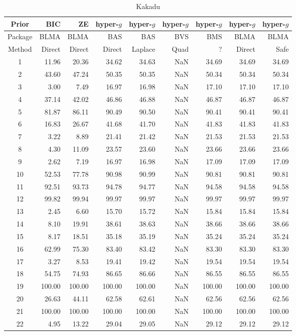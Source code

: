 \begin{table}[ht]
	\centering
	{\small 	
	\begin{tabular}{c|r|r|rrrrrr}
		Prior   & BIC    & ZE     & hyper-$g$ & hyper-$g$ & hyper-$g$  & hyper-$g$ & hyper-$g$ & hyper-$g$ \\
		\hline 
		Package & BLMA   & BLMA   & BAS       & BAS       & BVS        & BMS       & BLMA      & BLMA       \\
		\hline 
		Method  & Direct & Direct & Direct    & Laplace   & Quad & ?         & Direct    & Safe      \\ 
		\hline
		1 & 11.96 & 20.36 & 34.62 & 34.63 & NaN & 34.69 & 34.69 & 34.69 \\ 
		2 & 43.60 & 47.24 & 50.35 & 50.35 & NaN & 50.34 & 50.34 & 50.34 \\ 
		3 & 3.00 & 7.49 & 16.97 & 16.98 & NaN & 17.10 & 17.10 & 17.10 \\ 
		4 & 37.14 & 42.02 & 46.86 & 46.88 & NaN & 46.87 & 46.87 & 46.87 \\ 
		5 & 81.87 & 86.11 & 90.49 & 90.50 & NaN & 90.41 & 90.41 & 90.41 \\ 
		6 & 16.83 & 26.67 & 41.68 & 41.70 & NaN & 41.83 & 41.83 & 41.83 \\ 
		7 & 3.22 & 8.89 & 21.41 & 21.42 & NaN & 21.53 & 21.53 & 21.53 \\ 
		8 & 4.30 & 11.09 & 23.57 & 23.60 & NaN & 23.66 & 23.66 & 23.66 \\ 
		9 & 2.62 & 7.19 & 16.97 & 16.98 & NaN & 17.09 & 17.09 & 17.09 \\ 
		10 & 52.53 & 77.78 & 90.98 & 90.99 & NaN & 90.81 & 90.81 & 90.81 \\ 
		11 & 92.51 & 93.73 & 94.78 & 94.77 & NaN & 94.58 & 94.58 & 94.58 \\ 
		12 & 99.82 & 99.94 & 99.97 & 99.97 & NaN & 99.97 & 99.97 & 99.97 \\ 
		13 & 2.45 & 6.60 & 15.70 & 15.72 & NaN & 15.84 & 15.84 & 15.84 \\ 
		14 & 8.10 & 19.91 & 38.61 & 38.63 & NaN & 38.66 & 38.66 & 38.66 \\ 
		15 & 8.17 & 18.51 & 35.18 & 35.19 & NaN & 35.24 & 35.24 & 35.24 \\ 
		16 & 62.99 & 75.30 & 83.40 & 83.42 & NaN & 83.30 & 83.30 & 83.30 \\ 
		17 & 3.27 & 8.53 & 19.41 & 19.42 & NaN & 19.54 & 19.54 & 19.54 \\ 
		18 & 54.75 & 74.93 & 86.65 & 86.66 & NaN & 86.55 & 86.55 & 86.55 \\ 
		19 & 100.00 & 100.00 & 100.00 & 100.00 & NaN & 100.00 & 100.00 & 100.00 \\ 
		20 & 26.63 & 44.11 & 62.58 & 62.61 & NaN & 62.56 & 62.56 & 62.56 \\ 
		21 & 100.00 & 100.00 & 100.00 & 100.00 & NaN & 100.00 & 100.00 & 100.00 \\ 
		22 & 4.95 & 13.22 & 29.04 & 29.05 & NaN & 29.12 & 29.12 & 29.12 \\ 
		\hline
	\end{tabular}
}
	\caption{Kakadu}
	\label{tab:KakaduResults1}
\end{table}



